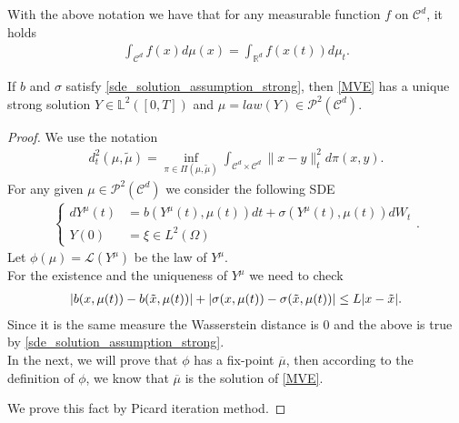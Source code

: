 \begin{remark}
With the above notation we have that for any measurable function $f$ on $\mathcal{C}^d$, it holds
 \begin{align*}
   \int_{\mathcal{C}^{d} } f(x) d\mu(x) = \int_{\mathbb{R}^{d} }  f(x(t)) d\mu_t
 .\end{align*}
\end{remark}
\begin{theorem}\label{solution_vlasov}
  If $b$ and $\sigma $ satisfy \autoref{sde_solution_assumption_strong}, then \autoref{MVE} has a unique  strong solution
  $Y \in  \mathbb{L}^2([0,T])$ and $\mu = law (Y)\in\mathcal{P}^2(\mathcal{C}^{d} )$.
\end{theorem}
\begin{proof}
 We use the notation 
 \begin{align*}
   d_t^2(\mu,\tilde\mu) =  \inf_{\pi  \in  \Pi(\mu,\tilde{\mu } )} \int_{\mathcal{C}^{d} \times  \mathcal{C}^{d}  }\|x-y\|^2_t d\pi(x,y)
 .\end{align*}
 For any given $\mu  \in \mathcal{P}^2(\mathcal{C}^{d} )$ we consider the following SDE 
 \begin{align*}
   \begin{cases} 
   dY^{\mu } (t) &= b(Y^{\mu} (t),\mu(t))dt + \sigma(Y^{\mu } (t),\mu(t))dW_t\\
    Y(0)   &= \xi \in  L^2(\Omega)
   \end{cases}
 .\end{align*}
 Let $\phi(\mu ) = \mathcal{L}(Y^{\mu } ) $ be the law of $Y^{\mu} $. \\[1ex]
 For the existence  and the uniqueness of $Y^{\mu } $ we need to check 
 \begin{align*}
   \lvert b(x,\mu(t)) - b(\tilde{x},\mu(t) )\rvert + \lvert\sigma(x,\mu(t)) - \sigma(\tilde{x},\mu(t))\rvert \le  L \lvert x-\tilde{x} \rvert
 .\end{align*}
 Since it is the same measure the Wasserstein distance is 0 and the above is true by \autoref{sde_solution_assumption_strong}.\\
 
In the next, we will prove that $\phi $ has a fix-point $\overline{\mu } $, then according to the definition of $\phi$, we know that $\overline{\mu } $ is the solution of \autoref{MVE}.
 
We prove this fact by Picard iteration method. 


\end{proof}
